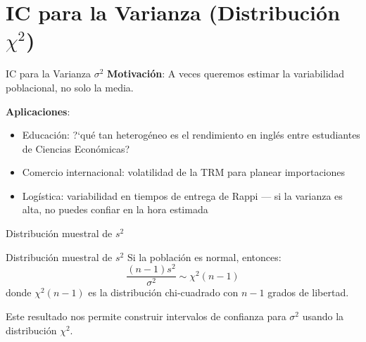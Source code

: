 \documentclass[aspectratio=169, 11pt]{beamer}
\begin{document}
\section{IC para la Varianza (Distribución $\chi^2$)}

\begin{frame}{IC para la Varianza $\sigma^2$}
\textbf{Motivaci\'on}: A veces queremos estimar la \alert{variabilidad} poblacional, no solo la media.

\vspace{0.3cm}
\textbf{Aplicaciones}:
\begin{itemize}
  \item Educaci\'on: ?`qu\'e tan heterog\'eneo es el rendimiento en ingl\'es entre estudiantes de Ciencias Econ\'omicas?
  \item Comercio internacional: volatilidad de la TRM para planear importaciones
  \item Log\'istica: variabilidad en tiempos de entrega de Rappi --- si la varianza es alta, no puedes confiar en la hora estimada
\end{itemize}
\end{frame}

\begin{frame}{Distribuci\'on muestral de $s^2$}
\begin{block}{Distribuci\'on muestral de $s^2$}
Si la poblaci\'on es normal, entonces:
\[
\frac{(n-1)s^2}{\sigma^2} \sim \chi^2(n-1)
\]
donde $\chi^2(n-1)$ es la distribuci\'on chi-cuadrado con $n-1$ grados de libertad.
\end{block}

\vspace{0.5em}
Este resultado nos permite construir intervalos de confianza para $\sigma^2$ usando la distribuci\'on $\chi^2$.
\end{frame}
\end{document}
